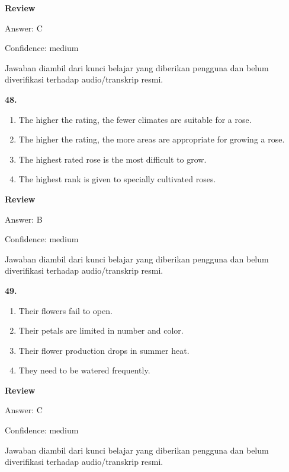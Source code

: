 \documentclass[12pt]{article}
\begin{document}
\begingroup
\setlength{\parskip}{0pt}
\setlength{\parindent}{0pt}
\textbf{Review}\par
Answer: C\par
Confidence: medium\par
Jawaban diambil dari kunci belajar yang diberikan pengguna dan belum diverifikasi terhadap audio/transkrip resmi.\par
\endgroup
\par
\vspace{0.25\baselineskip}
\noindent\textbf{48.}
\begin{enumerate}[label=(\Alph*),leftmargin=*,itemsep=0.2em]
\item The higher the rating, the fewer climates are suitable for a rose.
\item The higher the rating, the more areas are appropriate for growing a rose.
\item The highest rated rose is the most difficult to grow.
\item The highest rank is given to specially cultivated roses.
\end{enumerate}
\par
\begingroup
\setlength{\parskip}{0pt}
\setlength{\parindent}{0pt}
\textbf{Review}\par
Answer: B\par
Confidence: medium\par
Jawaban diambil dari kunci belajar yang diberikan pengguna dan belum diverifikasi terhadap audio/transkrip resmi.\par
\endgroup
\par
\vspace{0.25\baselineskip}
\noindent\textbf{49.}
\begin{enumerate}[label=(\Alph*),leftmargin=*,itemsep=0.2em]
\item Their flowers fail to open.
\item Their petals are limited in number and color.
\item Their flower production drops in summer heat.
\item They need to be watered frequently.
\end{enumerate}
\par
\begingroup
\setlength{\parskip}{0pt}
\setlength{\parindent}{0pt}
\textbf{Review}\par
Answer: C\par
Confidence: medium\par
Jawaban diambil dari kunci belajar yang diberikan pengguna dan belum diverifikasi terhadap audio/transkrip resmi.\par
\end{document}

